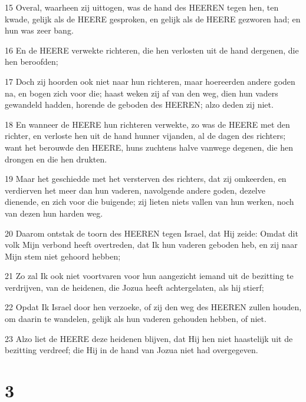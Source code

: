 \par 15 Overal, waarheen zij uittogen, was de hand des HEEREN tegen hen, ten kwade, gelijk als de HEERE gesproken, en gelijk als de HEERE gezworen had; en hun was zeer bang.
\par 16 En de HEERE verwekte richteren, die hen verlosten uit de hand dergenen, die hen beroofden;
\par 17 Doch zij hoorden ook niet naar hun richteren, maar hoereerden andere goden na, en bogen zich voor die; haast weken zij af van den weg, dien hun vaders gewandeld hadden, horende de geboden des HEEREN; alzo deden zij niet.
\par 18 En wanneer de HEERE hun richteren verwekte, zo was de HEERE met den richter, en verloste hen uit de hand hunner vijanden, al de dagen des richters; want het berouwde den HEERE, huns zuchtens halve vanwege degenen, die hen drongen en die hen drukten.
\par 19 Maar het geschiedde met het versterven des richters, dat zij omkeerden, en verdierven het meer dan hun vaderen, navolgende andere goden, dezelve dienende, en zich voor die buigende; zij lieten niets vallen van hun werken, noch van dezen hun harden weg.
\par 20 Daarom ontstak de toorn des HEEREN tegen Israel, dat Hij zeide: Omdat dit volk Mijn verbond heeft overtreden, dat Ik hun vaderen geboden heb, en zij naar Mijn stem niet gehoord hebben;
\par 21 Zo zal Ik ook niet voortvaren voor hun aangezicht iemand uit de bezitting te verdrijven, van de heidenen, die Jozua heeft achtergelaten, als hij stierf;
\par 22 Opdat Ik Israel door hen verzoeke, of zij den weg des HEEREN zullen houden, om daarin te wandelen, gelijk als hun vaderen gehouden hebben, of niet.
\par 23 Alzo liet de HEERE deze heidenen blijven, dat Hij hen niet haastelijk uit de bezitting verdreef; die Hij in de hand van Jozua niet had overgegeven.

\chapter{3}

